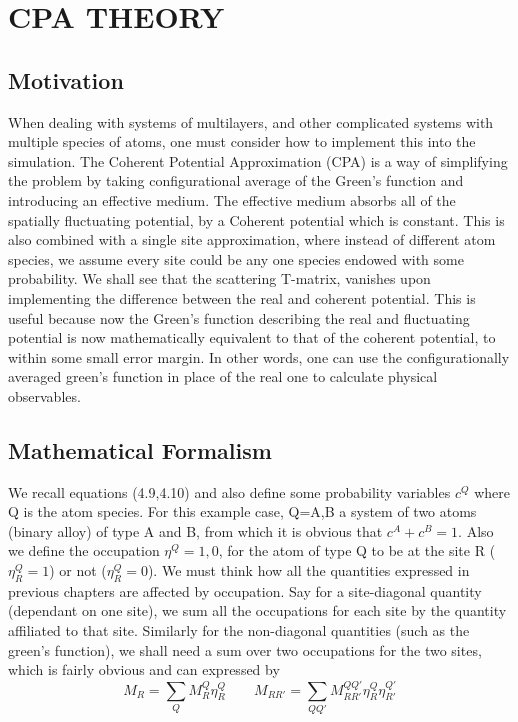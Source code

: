 \documentclass[12pt]{article}
\begin{document}
\section{CPA THEORY}
\subsection{Motivation}

When dealing with systems of multilayers, and other complicated systems with multiple species of atoms, one must consider how to implement this into the simulation. The Coherent Potential Approximation (CPA) is a way of simplifying the problem by taking configurational average of the Green's function and introducing an effective medium. The effective medium absorbs all of the spatially fluctuating potential, by a Coherent potential which is constant. This is also combined with a single site approximation, where instead of different atom species, we assume every site could be any one species endowed with some probability. We shall see that the scattering T-matrix, vanishes upon implementing the difference between the real and coherent potential. This is useful because now the Green's function describing the real and fluctuating potential is now mathematically equivalent to that of the coherent potential, to within some small error margin. In other words, one can use the configurationally averaged green's function in place of the real one to calculate physical observables.

\subsection{Mathematical Formalism}

We recall equations (4.9,4.10) and also define some probability variables $c^Q$ where Q is the atom species. For this example case, Q=A,B a system of two atoms (binary alloy) of type A and B, from which it is obvious that $c^A+c^B=1$. Also we define the occupation $\eta^Q={1,0}$, for the atom of type Q to be at the site R ($\eta_R^Q=1$) or not ($\eta_R^Q=0$). We must think how all the quantities expressed in previous chapters are affected by occupation. Say for a site-diagonal quantity (dependant on one site), we sum all the occupations for each site by the quantity affiliated to that site. Similarly for the non-diagonal quantities (such as the green's function), we shall need a sum over two occupations for the two sites, which is fairly obvious and can expressed by
$$M_R=\sum_Q M_R^Q \eta_R^Q \qquad M_{RR'}=\sum_{QQ'} M_{RR'}^{QQ'} \eta_R^Q \eta_{R'}^{Q'} $$
\end{document}
